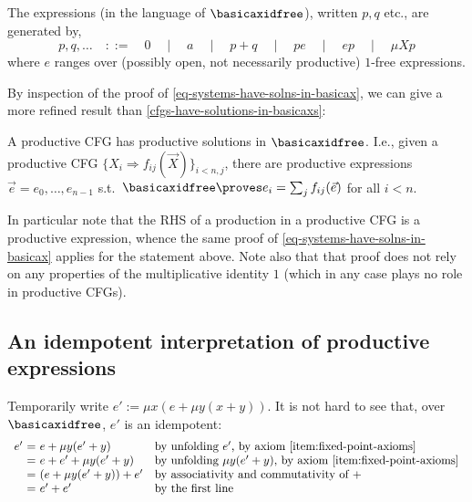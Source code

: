 \documentclass[runningheads]{amsart}
\begin{document}
The  expressions (in the language of $\basicaxidfree$), written $p,q$ etc., are generated by,
\begin{equation}
    \label{eq:productive-expressions}
    p,q,\dots \quad ::= \quad 0 \quad \mid \quad a 
\quad \mid \quad p+q 
\quad \mid \quad pe \quad \mid \quad ep
\quad \mid \quad \mu X p
\end{equation}
where $e$ ranges over (possibly open, not necessarily productive) $1$-free expressions.

By inspection of the proof of \cref{eq-systems-have-solns-in-basicax}, we can give a more refined result than \cref{cfgs-have-solutions-in-basicaxs}:

\begin{proposition}
\label{prod-cfg-has-prod-solns}
    A productive CFG has productive solutions in $\basicaxidfree$.
    I.e., given a productive CFG $\{X_i \Rightarrow f_{ij}(\vec X)\}_{i<n,j}$, there are productive expressions $\vec e = e_0, \dots, e_{n-1}$ s.t.\ $\basicaxidfree \proves e_i = \sum_j f_{ij}(\vec e)$ for all $i<n$.
\end{proposition}
In particular note that the RHS of a production in a productive CFG is a productive expression, whence the same proof of \cref{eq-systems-have-solns-in-basicax} applies for the statement above.
Note also that that proof does not rely on any properties of the multiplicative identity $1$ (which in any case plays no role in productive CFGs).

\subsection{An idempotent interpretation of productive expressions}

Temporarily write $e':= \mu x (e + \mu y (x + y))$. 
It is not hard to see that, over $\basicaxidfree$, $e'$ is an idempotent:
\[
\begin{array}{r@{\ = \ }ll}
      e'  & e + \mu y (e' + y) & \text{by unfolding $e'$, by axiom \eqref{item:fixed-point-axioms}} \\
        & e + e' + \mu y (e' + y) & \text{by unfolding $\mu y (e' + y)$, by axiom \eqref{item:fixed-point-axioms}} \\
        & (e + \mu y (e' + y) ) + e' & \text{by associativity and commutativity of $+$}\\
        & e' + e' & \text{by the first line}
\end{array}
\]
\end{document}

